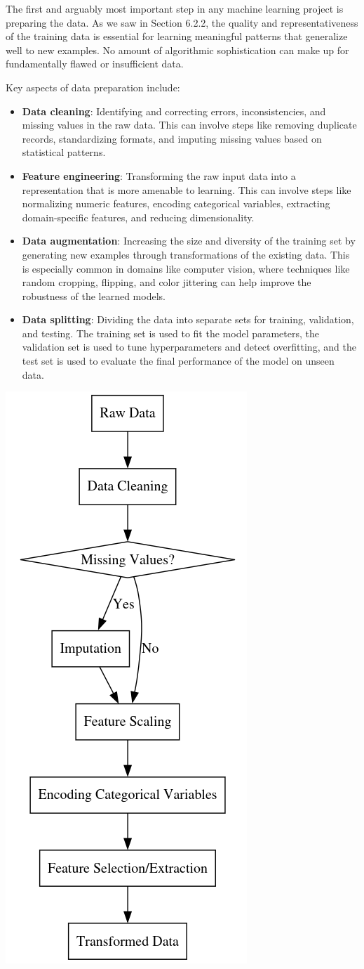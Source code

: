 \documentclass[
  9pt,
  letterpaper,
  abstract,
  titlepage]{scrbook}
\begin{document}
The first and arguably most important step in any machine learning
project is preparing the data. As we saw in Section 6.2.2, the quality
and representativeness of the training data is essential for learning
meaningful patterns that generalize well to new examples. No amount of
algorithmic sophistication can make up for fundamentally flawed or
insufficient data.

Key aspects of data preparation include:

\begin{itemize}
\item
  \textbf{Data cleaning}: Identifying and correcting errors,
  inconsistencies, and missing values in the raw data. This can involve
  steps like removing duplicate records, standardizing formats, and
  imputing missing values based on statistical patterns.
\item
  \textbf{Feature engineering}: Transforming the raw input data into a
  representation that is more amenable to learning. This can involve
  steps like normalizing numeric features, encoding categorical
  variables, extracting domain-specific features, and reducing
  dimensionality.
\item
  \textbf{Data augmentation}: Increasing the size and diversity of the
  training set by generating new examples through transformations of the
  existing data. This is especially common in domains like computer
  vision, where techniques like random cropping, flipping, and color
  jittering can help improve the robustness of the learned models.
\item
  \textbf{Data splitting}: Dividing the data into separate sets for
  training, validation, and testing. The training set is used to fit the
  model parameters, the validation set is used to tune hyperparameters
  and detect overfitting, and the test set is used to evaluate the final
  performance of the model on unseen data.
\end{itemize}

\begin{center}
\includegraphics[width=0.3\linewidth,height=\textheight,keepaspectratio]{contents/core/img/chapter10_ml.png}
\end{center}
\end{document}
